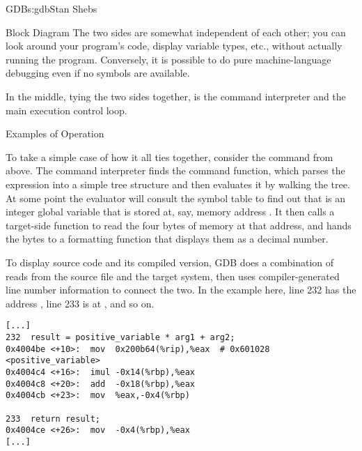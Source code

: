 \begin{aosachapter}{GDB}{s:gdb}{Stan Shebs}
\begin{aosasect1}{Block Diagram}
The two sides are somewhat independent of each other; you can look
around your program's code, display variable types, etc., without
actually running the program.  Conversely, it is possible to do pure
machine-language debugging even if no symbols are available.

In the middle, tying the two sides together, is the command
interpreter and the main execution control loop.

\end{aosasect1}

\begin{aosasect1}{Examples of Operation}

To take a simple case of how it all ties together, consider the 
command from above.  The command interpreter finds the  command
function, which parses the expression into a simple tree structure and
then evaluates it by walking the tree.  At some point the evaluator
will consult the symbol table to find out that
 is an integer global variable that is stored
at, say, memory address .  It then calls a target-side
function to read the four bytes of memory at that address, and hands
the bytes to a formatting function that displays them as a decimal
number.

To display source code and its compiled version, GDB does a
combination of reads from the source file and the target system, then
uses compiler-generated line number information to connect the two.
In the example here, line 232 has the address , line
233 is at , and so on.

\begin{verbatim}
[...]
232  result = positive_variable * arg1 + arg2;
0x4004be <+10>:  mov  0x200b64(%rip),%eax  # 0x601028 <positive_variable>
0x4004c4 <+16>:  imul -0x14(%rbp),%eax
0x4004c8 <+20>:  add  -0x18(%rbp),%eax
0x4004cb <+23>:  mov  %eax,-0x4(%rbp)

233  return result;
0x4004ce <+26>:  mov  -0x4(%rbp),%eax
[...]
\end{verbatim}


\end{aosasect1}
\end{aosachapter}
